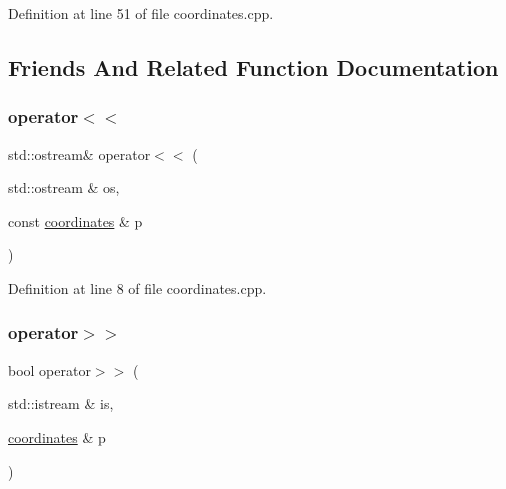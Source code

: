 Definition at line 51 of file coordinates.\+cpp.



\subsection{Friends And Related Function Documentation}
\mbox{\label{structbattle__ship_1_1coordinates_a3addd697b39df26c1807d744c30e65b5}} 
\subsubsection{\texorpdfstring{operator$<$$<$}{operator<<}}
{\footnotesize\ttfamily std\+::ostream\& operator$<$$<$ (\begin{DoxyParamCaption}\item[{std\+::ostream \&}]{os,  }\item[{const \hyperlink{structbattle__ship_1_1coordinates}{coordinates} \&}]{p }\end{DoxyParamCaption})\hspace{0.3cm}{\ttfamily [friend]}}



Definition at line 8 of file coordinates.\+cpp.

\mbox{\label{structbattle__ship_1_1coordinates_afd9a944ba3ab08355a0ae36d35e57d85}} 
\subsubsection{\texorpdfstring{operator$>$$>$}{operator>>}}
{\footnotesize\ttfamily bool operator$>$$>$ (\begin{DoxyParamCaption}\item[{std\+::istream \&}]{is,  }\item[{\hyperlink{structbattle__ship_1_1coordinates}{coordinates} \&}]{p }\end{DoxyParamCaption})\hspace{0.3cm}{\ttfamily [friend]}}



